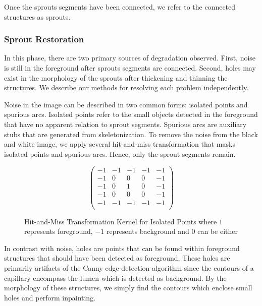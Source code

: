 \documentclass{sig-alternate}
\begin{document}
			Once the sprouts segments have been connected, we refer to the
			connected structures as sprouts.

		\subsubsection{Sprout Restoration} %
		\label{sub:Sprout Restoration}
			In this phase, there are two primary sources of degradation
			observed. First, noise is still in the foreground after
			sprouts segments are connected. Second, holes may exist in
			the morphology of the sprouts after thickening and thinning
			the structures. We describe our methods for resolving each
			problem independently.

			Noise in the image can be described in two common forms:
			isolated points and spurious arcs. Isolated points refer to
			the small objects detected in the foreground that have no
			apparent relation to sprout segments. Spurious arcs are
			auxiliary stubs that are generated from skeletonization. To
			remove the noise from the black and white image, we apply
			several hit-and-miss transformation that masks isolated points
			and spurious arcs. Hence, only the sprout segments remain.
			\begin{figure}[htp]
				\[
					\left(\begin{matrix}
						-1 & -1 & -1 & -1 & -1 \\
						-1 & 0 & 0 & 0 & -1 \\
						-1 & 0 & 1 & 0 & -1 \\
						-1 & 0 & 0 & 0 & -1 \\
						-1 & -1 & -1 & -1 & -1 \\
					\end{matrix} \right)
				\]
				\caption{Hit-and-Miss Transformation Kernel for Isolated
				Points where $1$ represents foreground, $-1$ represents
				background and $0$ can be either}
			\end{figure}

			In contrast with noise, holes are points that can be found
			within foreground structures that should have been detected as
			foreground. These holes are primarily artifacts of the Canny
			edge-detection algorithm since the contours of a capillary
			encompass the lumen which is detected as background. By the
			morphology of these structures, we simply find the contours
			which enclose small holes and perform inpainting.
\end{document}
